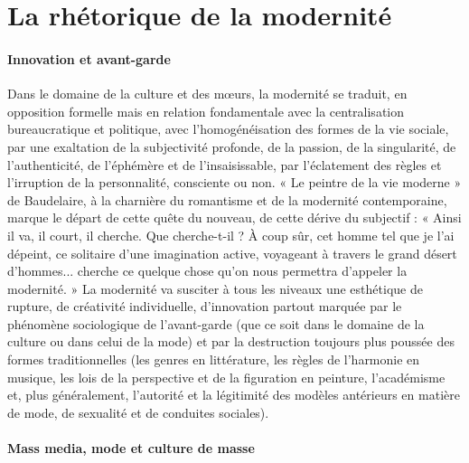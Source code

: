 \section{La rhétorique de la modernité}

\paragraph{Innovation et avant-garde}

Dans le domaine de la culture et des mœurs, la modernité se traduit, en opposition formelle mais en relation fondamentale avec la centralisation bureaucratique et politique, avec l'homogénéisation des formes de la vie sociale, par une exaltation de la subjectivité profonde, de la passion, de la singularité, de l'authenticité, de l'éphémère et de l'insaisissable, par l'éclatement des règles et l'irruption de la personnalité, consciente ou non.
« Le peintre de la vie moderne » de Baudelaire, à la charnière du romantisme et de la modernité contemporaine, marque le départ de cette quête du nouveau, de cette dérive du subjectif : « Ainsi il va, il court, il cherche. Que cherche-t-il ? À coup sûr, cet homme tel que je l'ai dépeint, ce solitaire d'une imagination active, voyageant à travers le grand désert d'hommes... cherche ce quelque chose qu'on nous permettra d'appeler la modernité. »
La modernité va susciter à tous les niveaux une esthétique de rupture, de créativité individuelle, d'innovation partout marquée par le phénomène sociologique de l'avant-garde (que ce soit dans le domaine de la culture ou dans celui de la mode) et par la destruction toujours plus poussée des formes traditionnelles (les genres en littérature, les règles de l'harmonie en musique, les lois de la perspective et de la figuration en peinture, l'académisme et, plus généralement, l'autorité et la légitimité des modèles antérieurs en matière de mode, de sexualité et de conduites sociales).

\paragraph{Mass media, mode et culture de masse}
 
